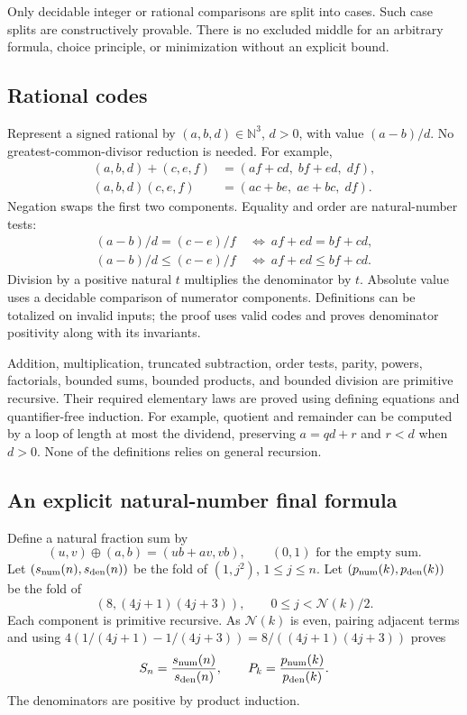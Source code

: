 \documentclass[11pt,a4paper]{article}
\theoremstyle{remark}\newtheorem{remark}[theorem]{Remark}
\newcommand{\N}{\mathbb N}
\newcommand{\cut}{\mathcal N}
\begin{document}
Only decidable integer or rational comparisons are split into cases.
Such case splits are constructively provable. There is no excluded
middle for an arbitrary formula, choice principle, or minimization
without an explicit bound.

\subsection{Rational codes}

Represent a signed rational by $(a,b,d)\in\N^3$, $d>0$, with value
$(a-b)/d$. No greatest-common-divisor reduction is needed.
For example,
\begin{align*}
 (a,b,d)+(c,e,f)&=(af+cd,\;bf+ed,\;df),\\
 (a,b,d)(c,e,f)&=(ac+be,\;ae+bc,\;df).
\end{align*}
Negation swaps the first two components. Equality and order are
natural-number tests:
\begin{align*}
 (a-b)/d=(c-e)/f&\ \Longleftrightarrow\ af+ed=bf+cd,\\
 (a-b)/d\le(c-e)/f&\ \Longleftrightarrow\ af+ed\le bf+cd.
\end{align*}
Division by a positive natural $t$ multiplies the denominator by $t$.
Absolute value uses a decidable comparison of numerator components.
Definitions can be totalized on invalid inputs; the proof uses valid
codes and proves denominator positivity along with its invariants.

Addition, multiplication, truncated subtraction, order tests, parity,
powers, factorials, bounded sums, bounded products, and bounded
division are primitive recursive. Their required elementary laws
are proved using defining equations and quantifier-free induction.
For example, quotient and remainder can be computed by a loop of
length at most the dividend, preserving $a=qd+r$ and $r<d$ when
$d>0$. None of the definitions relies on general recursion.

\subsection{An explicit natural-number final formula}

Define a natural fraction sum by
\[
 (u,v)\oplus(a,b)=(ub+av,vb),
 \qquad(0,1)\text{ for the empty sum}.
\]
Let $(s_{\rm num}(n),s_{\rm den}(n))$ be the fold of $(1,j^2)$,
$1\le j\le n$. Let $(p_{\rm num}(k),p_{\rm den}(k))$ be the fold of
\[
 \left(8,(4j+1)(4j+3)\right),\qquad0\le j<\cut(k)/2.
\]
Each component is primitive recursive. As $\cut(k)$ is even,
pairing adjacent terms and using
$4(1/(4j+1)-1/(4j+3))=8/((4j+1)(4j+3))$ proves
\[
 S_n=\frac{s_{\rm num}(n)}{s_{\rm den}(n)},\qquad
 P_k=\frac{p_{\rm num}(k)}{p_{\rm den}(k)}.
\]
The denominators are positive by product induction.
\end{document}
